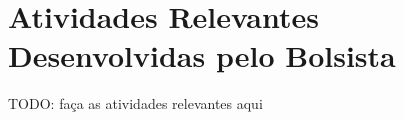 \section{Atividades Relevantes Desenvolvidas pelo Bolsista}

TODO: faça as atividades relevantes aqui
